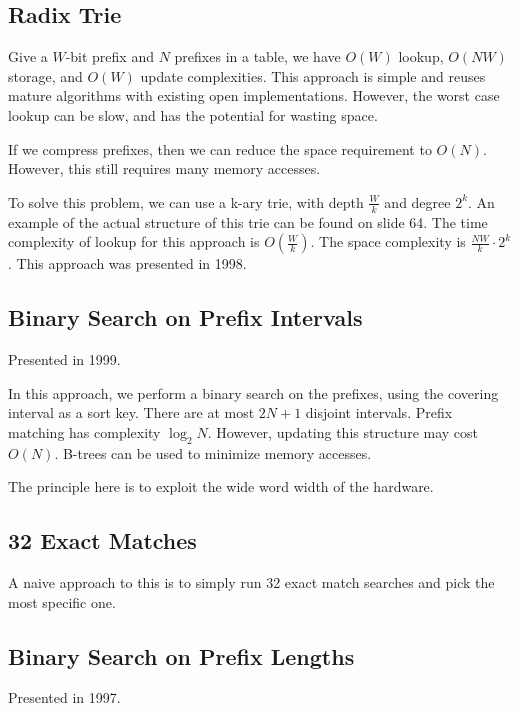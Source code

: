 \documentclass{idc_msc}
\begin{document}
\subsection{Radix Trie}

Give a \(W\)-bit prefix and \(N\) prefixes in a table, we have \(O(W)\) lookup, \(O(NW)\) storage, and \(O(W)\) update complexities.
This approach is simple and reuses mature algorithms with existing open implementations.
However, the worst case lookup can be slow, and has the potential for wasting space.

If we compress prefixes, then we can reduce the space requirement to \(O(N)\).
However, this still requires many memory accesses.

To solve this problem, we can use a k-ary trie, with depth \(\frac{W}{k}\) and degree \(2^k\).
An example of the actual structure of this trie can be found on slide 64.
The time complexity of lookup for this approach is \(O\left(\frac{W}{k}\right)\).
The space complexity is \(\frac{NW}{k} \cdot 2^k\).
This approach was presented in 1998\cite{Srinivasan:1998:FIL:277858.277863}.

\subsection{Binary Search on Prefix Intervals}

Presented in 1999\cite{Lampson:1999:ILU:312233.312242}.

In this approach, we perform a binary search on the prefixes, using the covering interval as a sort key.
There are at most \(2N + 1\) disjoint intervals.
Prefix matching has complexity \(\log_2 N\).
However, updating this structure may cost \(O(N)\).
B-trees can be used to minimize memory accesses.

The principle here is to exploit the wide word width of the hardware.

\subsection{32 Exact Matches}

A naive approach to this is to simply run 32 exact match searches and pick the most specific one.

\subsection{Binary Search on Prefix Lengths}

Presented in 1997\cite{Waldvogel:1997:SHS:263105.263136}.
\end{document}
